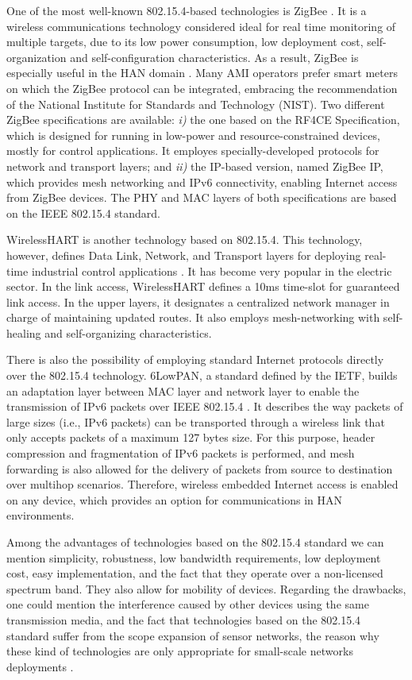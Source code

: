 \documentclass[11pt,draftclsnofoot,onecolumn]{IEEEtran}
\begin{document}
One of the most well-known 802.15.4-based technologies is ZigBee \cite{Alliance2010}. It is a wireless communications technology considered ideal for real time monitoring of multiple targets, due to its low power consumption, low deployment cost, self-organization and self-configuration characteristics. As a result, ZigBee is especially useful in the HAN domain \cite{Sabbah2014}. Many AMI operators prefer smart meters on which the ZigBee protocol can be integrated, embracing the recommendation of the National Institute for Standards and Technology (NIST). Two different ZigBee specifications are available: \textit{i)} the one based on the RF4CE Specification, which is designed for running in low-power and resource-constrained devices, mostly for control applications. It employes specially-developed protocols for network and transport layers; and \textit{ii)} the IP-based version, named ZigBee IP, which provides mesh networking and IPv6 connectivity, enabling Internet access from ZigBee devices. The PHY and MAC layers of both specifications are based on the IEEE 802.15.4 standard.  

WirelessHART is another technology based on 802.15.4. This technology, however, defines Data Link, Network, and Transport layers for deploying real-time industrial control applications \cite{Song2008}. It has become very popular in the electric sector. In the link access, WirelessHART defines a 10ms time-slot for guaranteed link access. In the upper layers, it designates a centralized network manager in charge of maintaining updated routes. It also employs mesh-networking with self-healing and self-organizing characteristics.

There is also the possibility of employing standard Internet protocols directly over the 802.15.4 technology. 6LowPAN, a standard defined by the IETF, builds an adaptation layer between MAC layer and network layer to enable the transmission of IPv6 packets over IEEE 802.15.4 \cite{RFC4944}.  It describes the way packets of large sizes (i.e., IPv6 packets) can be transported through a wireless link that only accepts packets of a maximum 127 bytes size. For this purpose, header compression and fragmentation of IPv6 packets is performed, and mesh forwarding is also allowed for the delivery of packets from source to destination over multihop scenarios. Therefore, wireless embedded Internet access is enabled on any device, which provides an option for communications in HAN environments.
 
Among the advantages of technologies based on the 802.15.4 standard we can mention simplicity, robustness, low bandwidth requirements, low deployment cost, easy implementation, and the fact that they operate over a non-licensed spectrum band. They also allow for mobility of  devices. Regarding the drawbacks, one could mention the interference caused by other devices using the same transmission media, and the fact that technologies based on the 802.15.4 standard suffer from the scope expansion of sensor networks, the reason why these kind of technologies are only appropriate for small-scale networks deployments  \cite{Lu2011}.
 
\end{document}
